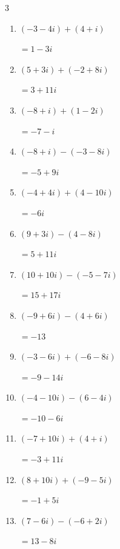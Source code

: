 \begin{multicols}{3}
\begin{enumerate}
        $\displaystyle =5+12i$

  \item $\displaystyle (-3-4i) + (4+i)$

        $\displaystyle =1-3i$

  \item $\displaystyle (5+3i) + (-2+8i)$

        $\displaystyle =3+11i$

  \item $\displaystyle (-8+i) + (1-2i)$

        $\displaystyle =-7-i$

  \item $\displaystyle (-8+i) - (-3-8i)$

        $\displaystyle =-5+9i$

  \item $\displaystyle (-4+4i) + (4-10i)$

        $\displaystyle =-6i$

  \item $\displaystyle (9+3i) - (4-8i)$

        $\displaystyle =5+11i$

  \item $\displaystyle (10+10i) - (-5-7i)$

        $\displaystyle =15+17i$

  \item $\displaystyle (-9+6i) - (4+6i)$

        $\displaystyle =-13$

  \item $\displaystyle (-3-6i) + (-6-8i)$

        $\displaystyle =-9-14i$

\columnbreak %

  \item $\displaystyle (-4-10i) - (6-4i)$

        $\displaystyle =-10-6i$

  \item $\displaystyle (-7+10i) + (4+i)$

        $\displaystyle =-3+11i$

  \item $\displaystyle (8+10i) + (-9-5i)$

        $\displaystyle =-1+5i$

  \item $\displaystyle (7-6i) - (-6+2i)$

        $\displaystyle =13-8i$


\end{enumerate}
\end{multicols}
